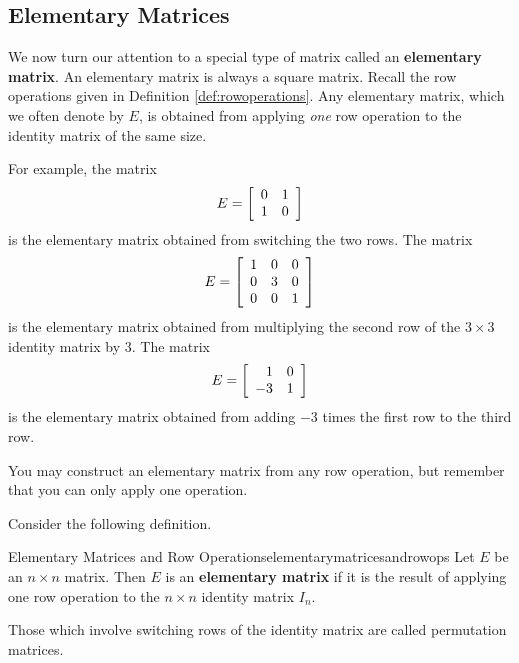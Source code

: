
\subsection{Elementary Matrices}

We now turn our attention to a special type of matrix called an \textbf{elementary matrix}. 
An elementary matrix is always a square matrix. Recall the row operations given in Definition \ref{def:rowoperations}.
Any elementary matrix, which we often denote by $E$, is obtained from applying
{\em one\em} row operation to the identity matrix of the same size. 

For example, the matrix
\begin{equation*}
E = 
\left[
\begin{array}{rr}
0 & 1 \\
1 & 0
\end{array}
\right]
\end{equation*}
is the elementary matrix obtained from switching the two rows. 
The matrix 
\begin{equation*}
E = 
\left[
\begin{array}{rrr}
1 & 0 & 0 \\
0 & 3 & 0 \\
0 & 0 & 1
\end{array}
\right]
\end{equation*}
is the elementary matrix obtained from multiplying the second row of the $3 \times 3$ identity matrix
by $3$.
The matrix
\begin{equation*}
E = 
\left[
\begin{array}{rr}
1 & 0 \\
-3 & 1
\end{array}
\right]
\end{equation*}
is the elementary matrix obtained from adding $-3$ times the first row to the third row.

You may construct an elementary matrix from any row operation, but remember that you can only apply one operation.

Consider the following definition. 

\begin{definition}{Elementary Matrices and Row Operations}{elementarymatricesandrowops}
Let $E$ be an $n \times n$ matrix. Then $E$ is an \textbf{elementary matrix}  
if it is the result of applying one row operation to the $n \times n$ identity matrix $I_n$. 

Those which involve switching rows of the identity matrix are called
permutation matrices.
\end{definition}


